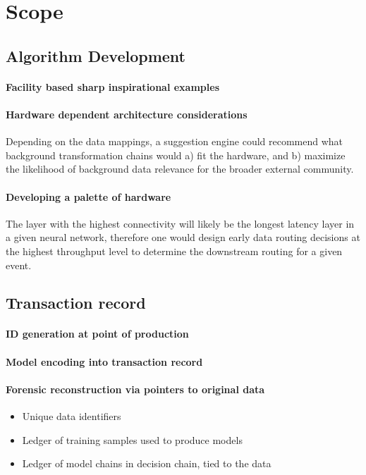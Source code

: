 \documentclass{article}
\begin{document}
\section{Scope}

\subsection{Algorithm Development}
\paragraph{Facility based sharp inspirational examples}
\paragraph{Hardware dependent architecture considerations}
Depending on the data mappings, a suggestion engine could recommend what background transformation chains would a) fit the hardware, and b) maximize the likelihood of background data relevance for the broader external community.

\paragraph{Developing a palette of hardware}
The layer with the highest connectivity will likely be the longest latency layer in a given neural network, therefore one would design early data routing decisions at the highest throughput level to determine the downstream routing for a given event.  

\subsection{Transaction record}
\paragraph{ID generation at point of production}
\paragraph{Model encoding into transaction record}
\paragraph{Forensic reconstruction via pointers to original data}
\begin{itemize}
\item Unique data identifiers
\item Ledger of training samples used to produce models
\item Ledger of model chains in decision chain, tied to the data
\end{itemize}
\end{document}
